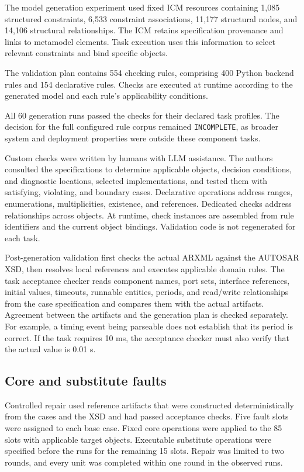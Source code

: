 \documentclass[pdflatex,iicol,sn-mathphys-num]{sn-jnl}
\begin{document}
The model generation experiment used fixed ICM resources containing 1,085 structured constraints, 6,533 constraint associations, 11,177 structural nodes, and 14,106 structural relationships. The ICM retains specification provenance and links to metamodel elements. Task execution uses this information to select relevant constraints and bind specific objects.


The validation plan contains 554 checking rules, comprising 400 Python backend rules and 154 declarative rules. Checks are executed at runtime according to the generated model and each rule's applicability conditions.

All 60 generation runs passed the checks for their declared task profiles. The decision for the full configured rule corpus remained \texttt{INCOMPLETE}, as broader system and deployment properties were outside these component tasks.


Custom checks were written by humans with LLM assistance. The authors consulted the specifications to determine applicable objects, decision conditions, and diagnostic locations, selected implementations, and tested them with satisfying, violating, and boundary cases. Declarative operations address ranges, enumerations, multiplicities, existence, and references. Dedicated checks address relationships across objects. At runtime, check instances are assembled from rule identifiers and the current object bindings. Validation code is not regenerated for each task.


Post-generation validation first checks the actual ARXML against the AUTOSAR XSD, then resolves local references and executes applicable domain rules. The task acceptance checker reads component names, port sets, interface references, initial values, timeouts, runnable entities, periods, and read/write relationships from the case specification and compares them with the actual artifacts. Agreement between the artifacts and the generation plan is checked separately. For example, a timing event being parseable does not establish that its period is correct. If the task requires 10 ms, the acceptance checker must also verify that the actual value is 0.01 s.


\subsection{Core and substitute faults}\label{app:A-3}

Controlled repair used reference artifacts that were constructed deterministically from the cases and the XSD and had passed acceptance checks. Five fault slots were assigned to each base case. Fixed core operations were applied to the 85 slots with applicable target objects. Executable substitute operations were specified before the runs for the remaining 15 slots. Repair was limited to two rounds, and every unit was completed within one round in the observed runs.
\end{document}
